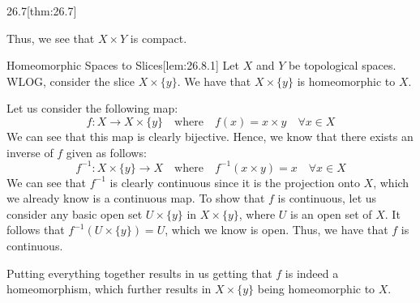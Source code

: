 \begin{thmBox}{26.7}[thm:26.7]
\begin{proofBox}
        \baseSkip

        Thus, we see that \( X \times Y \) is compact.
    \end{proofBox}
\end{thmBox}

\begin{thmBox}[Lemma]{Homeomorphic Spaces to Slices}[lem:26.8.1]
    Let \( X \) and \( Y \) be topological spaces.
    WLOG, consider the slice \( X \times \{ y \} \).
    We have that \( X \times \{ y \} \) is homeomorphic to \( X \).

    \baseRule

    \begin{proofBox}
        Let us consider the following map:
        \begin{equation*}
            f: X \rightarrow X \times \{ y \}
            \quad \mathrm{where} \quad 
            f ( x ) = x \times y 
            \quad \forall x \in X
        \end{equation*}
        We can see that this map is clearly bijective.
        Hence, we know that there exists an inverse of \( f \) given as follows:
        \begin{equation*}
            f^{ -1 }: X \times \{ y \} \rightarrow X
            \quad \mathrm{where} \quad 
            f^{ -1 } ( x \times y ) = x
            \quad \forall x \in X
        \end{equation*}
        We can see that \( f^{ -1 } \) is clearly continuous since it is
        the projection onto \( X \), which we already know is a continuous map.
        To show that \( f \) is continuous, let us consider any basic open set 
        \( U \times \{ y \} \) in \( X \times \{ y \} \), where \( U \) is an
        open set of \( X \).
        It follows that \( f^{ -1 } ( U \times \{ y \} ) = U \), which we know 
        is open.
        Thus, we have that \( f \) is continuous.

        \baseSkip

        Putting everything together results in us getting that \( f \) is 
        indeed a homeomorphism, which further results in \( X \times \{ y \} \)
        being homeomorphic to \( X \).
    \end{proofBox}
\end{thmBox}

